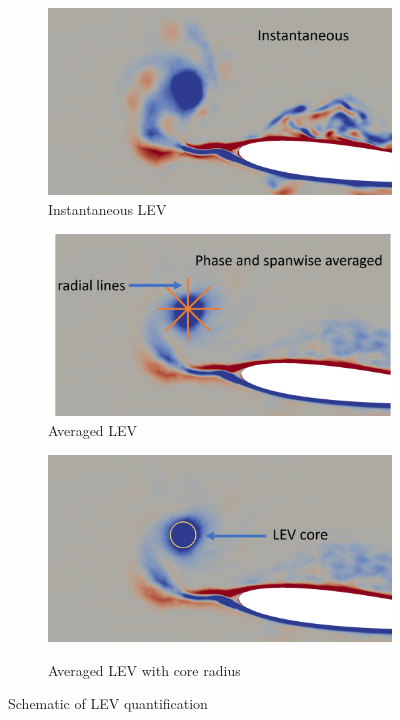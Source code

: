 \begin{figure}[H]
	\begin{subfigure}{0.5\textwidth}
		\includegraphics[width=1\textwidth]{figures/adapt_strat/LEV_tracking1.png}
		\caption{Instantaneous LEV}
		\label{fig:LEV_tracking1}
	\end{subfigure}
	\begin{subfigure}{0.51\textwidth}
	\includegraphics[width=1\textwidth]{figures/adapt_strat/LEV_tracking2.png}
	\caption{Averaged LEV}
	\label{fig:LEV_tracking2}
	\end{subfigure}

	\centering
	\begin{subfigure}{0.5\textwidth}
	\includegraphics[width=1\textwidth]{figures/adapt_strat/LEV_tracking3.png}
	\label{fig:LEV_tracking3}
    \caption{Averaged LEV with core radius}
\end{subfigure}
	
	\caption{Schematic of LEV quantification}
	\label{fig:LEV_tracking}
\end{figure}


